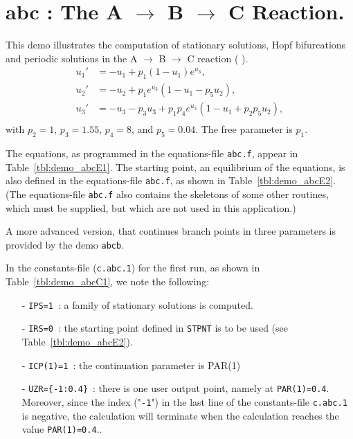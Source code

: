 \documentclass[12pt]{report}
\begin{document}
\newpage
\section{ abc : The A $\to$ B $\to$ C Reaction.} \label{sec:Demos_abc}
This demo illustrates the computation of 
stationary solutions,
Hopf bifurcations 
and
periodic solutions
in the A $\to$ B $\to$ C reaction 
( \citeyear{DoHe:83}).
\begin{equation} \begin{array}{cl}
  u_1 ' &=  -u_1 + p_1 (1-u_1) e^{u_3}, \\
  u_2 ' &=  -u_2 +  p_1 e^{u_3} ( 1-u_1 - p_5 u_2 ),\\
  u_3 ' &=  -u_3 - p_3 u_3 + p_1 p_4 e^{u_3}  
  ( 1-u_1 + p_2 p_5 u_2 ),\\ \end{array} \end{equation}
with $p_2=1$, $p_3=1.55$, $p_4=8$, and $p_5=0.04$. 
The free parameter is $p_1$.

The equations, as programmed in the equations-file {\tt abc.f},
appear in Table~\ref{tbl:demo_abcE1}.
The starting point, an equilibrium of the equations,
is also defined in  the equations-file {\tt abc.f},
as shown in  Table~\ref{tbl:demo_abcE2}.
(The equations-file {\tt abc.f} also contains the skeletons
of some other routines, which must be supplied, but which 
are not used in this application.)

A more advanced version, that continues branch points in three
parameters is provided by the demo {\tt abcb}.

In the constants-file ({\tt c.abc.1}) for the first run, as shown in 
Table~\ref{tbl:demo_abcC1}, we note the following:

\begin{itemize}
\item[-] {\tt IPS=1}~: a family of stationary solutions is computed.

\item[-] {\tt IRS=0}~: the starting point defined in {\tt STPNT} 
	 is to be used (see  Table~\ref{tbl:demo_abcE2}). 

\item[-] {\tt ICP(1)=1}~: the continuation parameter is PAR(1) 

\item[-] {\tt UZR=\{-1:0.4\}}~: there is one user output point, namely at
	 {\tt PAR(1)=0.4}. Moreover, since the index ("{\tt -1}") in
	 the last line of the constants-file {\tt c.abc.1} is negative, 
	 the calculation will terminate when the calculation reaches
	 the value {\tt PAR(1)=0.4}..
\end{itemize}
\end{document}
